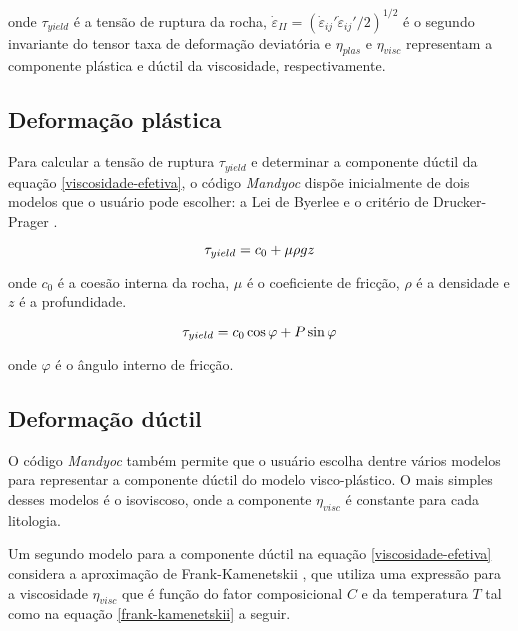 \noindent onde $\tau_{yield}$ é a tensão de ruptura da rocha, $\dot{\varepsilon}_{II}=(\dot{\varepsilon}_{ij}' \dot{\varepsilon}_{ij}'/2)^{1/2}$ é o segundo invariante do tensor taxa de deformação deviatória e $\eta_{plas}$ e $\eta_{visc}$ representam a componente plástica e dúctil da viscosidade, respectivamente.

\subsection{Deformação plástica}

Para calcular a tensão de ruptura $\tau_{yield}$ e determinar a componente dúctil da equação \ref{viscosidade-efetiva}, o código \textit{Mandyoc} dispõe inicialmente de dois modelos que o usuário pode escolher: a Lei de Byerlee \citep[equação \ref{byerlee-law}]{byerlee1968} e o critério de Drucker-Prager \citep[equação \ref{drucker-prager}]{drucker-prager1952}.

\begin{equation}{\label{byerlee-law}}
    \tau_{yield} = c_0 + \mu \rho g z
\end{equation}

\noindent onde $c_0$ é a coesão interna da rocha, $\mu$ é o coeficiente de fricção, $\rho$ é a densidade e $z$ é a profundidade.

\begin{equation}{\label{drucker-prager}}
    \tau_{yield} = c_0 \cos{\varphi} + P \sin{\varphi}
\end{equation}

\noindent onde $\varphi$ é o ângulo interno de fricção.

\subsection{Deformação dúctil}

O código \textit{Mandyoc} também permite que o usuário escolha dentre vários modelos para representar a componente dúctil do modelo visco-plástico. O mais simples desses modelos é o isoviscoso, onde a componente $\eta_{visc}$ é constante para cada litologia.

Um segundo modelo para a componente dúctil na equação \ref{viscosidade-efetiva} considera a aproximação de Frank-Kamenetskii \citep{moresisolomatov1998}, que utiliza uma expressão para a viscosidade $\eta_{visc}$ que é função do fator composicional $C$ e da temperatura $T$ tal como na equação \ref{frank-kamenetskii} a seguir.


